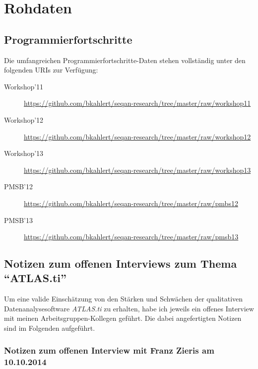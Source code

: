 \chapter{Rohdaten} 

\section{Programmierfortschritte}

Die umfangreichen Programmierfortschritte-Daten stehen vollständig unter den folgenden URIs zur Verfügung:

\begin{description}
  \item[Workshop'11] \url{https://github.com/bkahlert/seqan-research/tree/master/raw/workshop11}
  \item[Workshop'12] \url{https://github.com/bkahlert/seqan-research/tree/master/raw/workshop12}
  \item[Workshop'13] \url{https://github.com/bkahlert/seqan-research/tree/master/raw/workshop13}
  \item[PMSB'12] \url{https://github.com/bkahlert/seqan-research/tree/master/raw/pmbs12}
  \item[PMSB'13] \url{https://github.com/bkahlert/seqan-research/tree/master/raw/pmsb13}
\end{description}

\section[Interviewnotizen ``ATLAS.ti'']{Notizen zum offenen Interviews zum Thema ``ATLAS.ti''}

Um eine valide Einschätzung von den Stärken und Schwächen der qualitativen Datenanalysesoftware \textit{ATLAS.ti} zu erhalten, habe ich jeweils ein offenes Interview mit meinen Arbeitsgruppen-Kollegen geführt. Die dabei angefertigten Notizen sind im Folgenden aufgeführt.

\subsection[Franz Zieris, 10.10.2014]{Notizen zum offenen Interview mit Franz Zieris am 10.10.2014}

